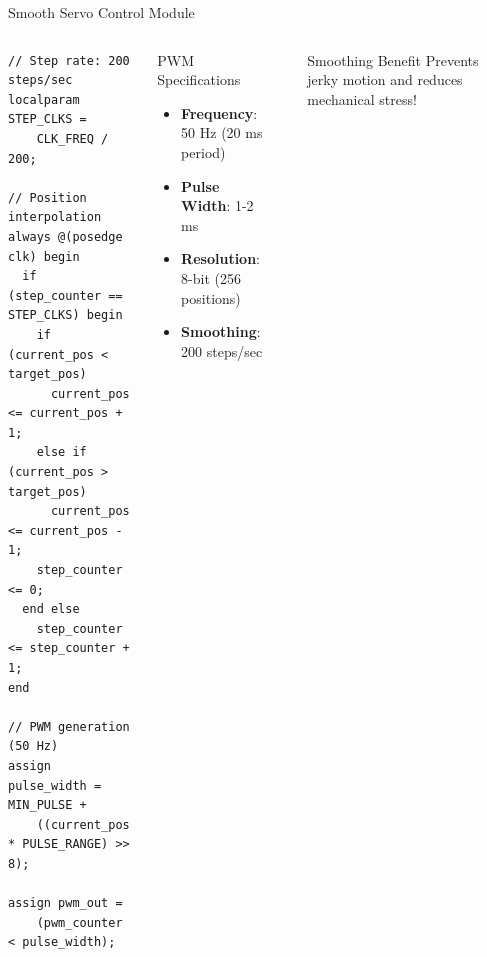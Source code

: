 \documentclass[aspectratio=169]{beamer}
\begin{document}
\begin{frame}[fragile]{Smooth Servo Control Module}
\begin{columns}
\begin{lstlisting}[style=verilog, caption=Smooth Servo PWM]
// Step rate: 200 steps/sec
localparam STEP_CLKS =
    CLK_FREQ / 200;

// Position interpolation
always @(posedge clk) begin
  if (step_counter == STEP_CLKS) begin
    if (current_pos < target_pos)
      current_pos <= current_pos + 1;
    else if (current_pos > target_pos)
      current_pos <= current_pos - 1;
    step_counter <= 0;
  end else
    step_counter <= step_counter + 1;
end

// PWM generation (50 Hz)
assign pulse_width = MIN_PULSE +
    ((current_pos * PULSE_RANGE) >> 8);

assign pwm_out =
    (pwm_counter < pulse_width);
\end{lstlisting}

\begin{block}{PWM Specifications}
\begin{itemize}
    \item \textbf{Frequency}: 50 Hz (20 ms period)
    \item \textbf{Pulse Width}: 1-2 ms
    \item \textbf{Resolution}: 8-bit (256 positions)
    \item \textbf{Smoothing}: 200 steps/sec
\end{itemize}
\end{block}

\begin{center}
\end{center}

\begin{alertblock}{Smoothing Benefit}
Prevents jerky motion and reduces mechanical stress!
\end{alertblock}
\end{columns}
\end{frame}
\end{document}
